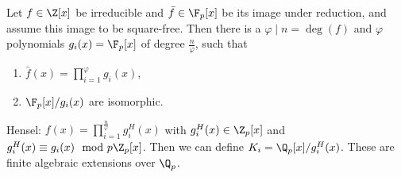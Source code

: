 \documentclass{jvfscript}
\begin{document}
	\begin{thm}
		Let $ f \in \Z[x] $ be irreducible and $ \bar{f} \in \F_p[x] $ be its image under reduction, and assume this image to be square-free. Then there is a $\varphi \mid n = \deg(f)$ and $\varphi$ polynomials $ g_i(x) = \F_p[x] $ of degree $ \frac{n}{\varphi} $, such that
		\begin{enumerate}[label={\roman*})]
			\item $ \bar{f}(x) = \prod_{i=1}^{\varphi} g_i(x) $,
			\item $ \F_p[x]/g_i(x) $ are isomorphic.
		\end{enumerate}
	\end{thm}
	Hensel: $ f(x) = \prod_{i=1}^{\frac{n}{\varphi}} g_i^H(x) $ with $ g_i^H(x) \in \Z_p[x] $ and $ g_i^H(x) \equiv g_i(x) \mod p\Z_p[x] $. Then we can define $ K_i = \Q_p[x]/g_i^H(x) $. These are finite algebraic extensions over $\Q_p$.
	
	
	
	\printindex
\end{document}
